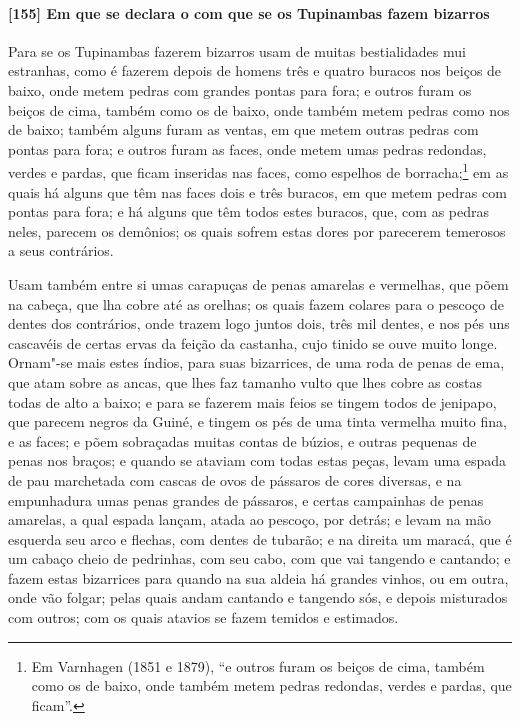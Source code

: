 \paragraph{[155] Em que se declara o com que se os Tupinambas fazem bizarros}\quad
Para se os Tupinambas fazerem bizarros usam de muitas bestialidades mui estranhas, como é
fazerem depois de homens três e quatro buracos nos beiços de baixo, onde metem pedras com
grandes pontas para fora; e outros furam os beiços de cima, também como os de baixo, onde
também metem pedras como nos de baixo; também alguns furam as ventas, em que metem outras
pedras com pontas para fora; e outros furam as faces, onde metem umas pedras redondas,
verdes e pardas, que ficam inseridas nas faces, como espelhos de borracha;\footnote{ Em
Varnhagen (1851 e 1879), ``e outros furam os beiços de cima, também como os de baixo, onde
também metem pedras redondas, verdes e pardas, que ficam''.} em as quais há alguns que têm
nas faces dois e três buracos, em que metem pedras com pontas para fora; e há alguns que
têm todos estes buracos, que, com as pedras neles, parecem os demônios; os quais sofrem
estas dores por parecerem temerosos a seus contrários.

Usam também entre si umas carapuças de penas amarelas e vermelhas, que põem na cabeça, que
lha cobre até as orelhas; os quais fazem colares para o pescoço de dentes dos contrários,
onde trazem logo juntos dois, três mil dentes, e nos pés uns cascavéis de certas ervas da
feição da castanha, cujo tinido se ouve muito longe. Ornam"-se mais estes índios, para suas
bizarrices, de uma roda de penas de ema, que atam sobre as ancas, que lhes faz tamanho
vulto que lhes cobre as costas todas de alto a baixo; e para se fazerem mais feios se
tingem todos de jenipapo, que parecem negros da Guiné, e tingem os pés de uma tinta
vermelha muito fina, e as faces; e põem sobraçadas muitas contas de búzios, e outras
pequenas de penas nos braços; e quando se ataviam com todas estas peças, levam uma espada
de pau marchetada com cascas de ovos de pássaros de cores diversas, e na empunhadura umas
penas grandes de pássaros, e certas campainhas de penas amarelas, a qual espada lançam,
atada ao pescoço, por detrás; e levam na mão esquerda seu arco e flechas, com dentes de
tubarão; e na direita um maracá, que é um cabaço cheio de pedrinhas, com seu cabo, com que
vai tangendo e cantando; e fazem estas bizarrices para quando na sua aldeia há grandes
vinhos, ou em outra, onde vão folgar; pelas quais andam cantando e tangendo sós, e depois
misturados com outros; com os quais atavios se fazem temidos e estimados.

